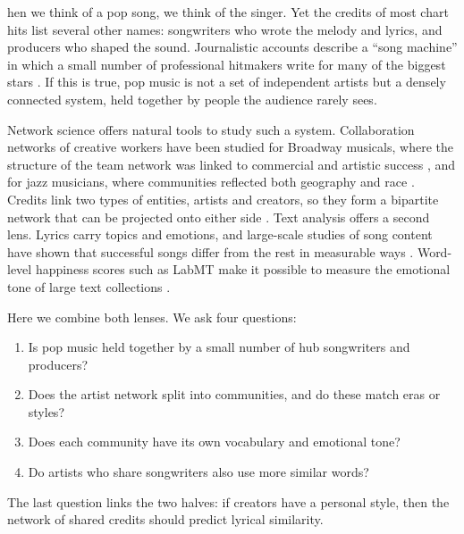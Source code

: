 \documentclass[9pt,twocolumn,twoside]{pnas-new}
\providecommand{\Firstpage}{}
\providecommand{\Endparasplit}{}
\begin{document}

\maketitle
\thispagestyle{firststyle}

\Firstpage

hen we think of a pop song, we think of the singer. Yet the credits of most chart hits list several other names: songwriters who wrote the melody and lyrics, and producers who shaped the sound. Journalistic accounts describe a ``song machine'' in which a small number of professional hitmakers write for many of the biggest stars \cite{seabrook2015}. If this is true, pop music is not a set of independent artists but a densely connected system, held together by people the audience rarely sees.

Network science offers natural tools to study such a system. Collaboration networks of creative workers have been studied for Broadway musicals, where the structure of the team network was linked to commercial and artistic success \cite{uzzi2005}, and for jazz musicians, where communities reflected both geography and race \cite{gleiser2003}. Credits link two types of entities, artists and creators, so they form a bipartite network that can be projected onto either side \cite{newman2001random,zhou2007}. Text analysis offers a second lens. Lyrics carry topics and emotions, and large-scale studies of song content have shown that successful songs differ from the rest in measurable ways \cite{interiano2018}. Word-level happiness scores such as LabMT make it possible to measure the emotional tone of large text collections \cite{dodds2011}.

Here we combine both lenses. We ask four questions:
\begin{enumerate}
\item Is pop music held together by a small number of hub songwriters and producers?
\item Does the artist network split into communities, and do these match eras or styles?
\item Does each community have its own vocabulary and emotional tone?
\item Do artists who share songwriters also use more similar words?
\end{enumerate}
The last question links the two halves: if creators have a personal style, then the network of shared credits should predict lyrical similarity.\Endparasplit
\end{document}
